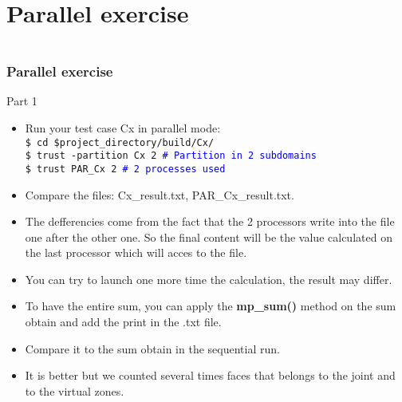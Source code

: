 \documentclass[10pt, hyperref={unicode=true,pdfusetitle, bookmarks=true,bookmarksnumbered=false,bookmarksopen=false, breaklinks=false,pdfborder={0 0 1},backref=true,colorlinks=true,linkcolor=darkblue,pageanchor, urlcolor=darkblue}]{beamer}
\begin{document}
\section{{\bf{Parallel exercise}}}
\begin{frame}
\begin{columns}[c] 
\tableofcontents[sections={1-3},currentsection, currentsubsection]
\tableofcontents[sections={4-8},currentsection, currentsubsection]
\end{columns}
\end{frame}
\begin{frame}
\frametitle{Parallel exercise}

\begin{block}{Part 1}
\begin{itemize}
\item Run your test case Cx in parallel mode:\\
    \texttt{\$ cd \$project\_directory/build/Cx/}\\
\texttt{\$ trust -partition Cx 2 \textcolor{blue}{\# Partition in 2 subdomains}}\\
\texttt{\$ trust PAR\_Cx 2 \textcolor{blue}{\# 2 processes used}}

\item Compare the files: Cx\_result.txt, PAR\_Cx\_result.txt.

\item The defferencies come from the fact that the 2 processors write into the file one after the other one.
So the final content will be the value calculated on the last processor which will acces to the file.

\item You can try to launch one more time the calculation, the result may differ.

\item To have the entire sum, you can apply the \textbf{mp\_sum()} method on the sum obtain and add the print in the .txt file.

\item Compare it to the sum obtain in the sequential run.

\item It is better but we counted several times faces that belongs to the joint and to the virtual zones.
\end{itemize}

\end{block}
\end{frame}
\end{document}
